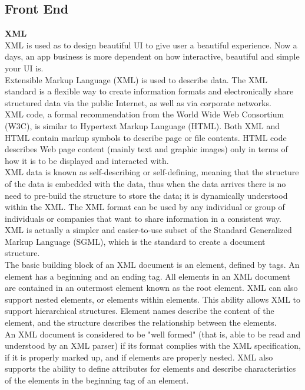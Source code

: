 \subsection{Front End}
\textbf{XML}\\
XML is used as to design beautiful UI to give user a beautiful experience. Now a days, an app business is more dependent on how interactive, beautiful and simple your UI is.\\
Extensible Markup Language (XML) is used to describe data. The XML standard is a flexible way to create information formats and electronically share structured data via the public Internet, as well as via corporate networks.\\
XML code, a formal recommendation from the World Wide Web Consortium (W3C), is similar to Hypertext Markup Language (HTML). Both XML and HTML contain markup symbols to describe page or file contents. HTML code describes Web page content (mainly text and graphic images) only in terms of how it is to be displayed and interacted with.\\
XML data is known as self-describing or self-defining, meaning that the structure of the data is embedded with the data, thus when the data arrives there is no need to pre-build the structure to store the data; it is dynamically understood within the XML. The XML format can be used by any individual or group of individuals or companies that want to share information in a consistent way. XML is actually a simpler and easier-to-use subset of the Standard Generalized Markup Language (SGML), which is the standard to create a document structure.\\
The basic building block of an XML document is an element, defined by tags. An element has a beginning and an ending tag. All elements in an XML document are contained in an outermost element known as the root element. XML can also support nested elements, or elements within elements. This ability allows XML to support hierarchical structures. Element names describe the content of the element, and the structure describes the relationship between the elements.\\
An XML document is considered to be "well formed" (that is, able to be read and understood by an XML parser) if its format complies with the XML specification, if it is properly marked up, and if elements are properly nested. XML also supports the ability to define attributes for elements and describe characteristics of the elements in the beginning tag of an element.\\
